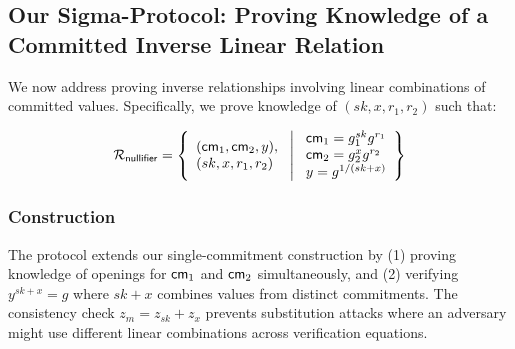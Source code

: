 \subsection{Our Sigma-Protocol: Proving Knowledge of a Committed Inverse Linear Relation}\label{sec-pok-committed-inv-linear-relation}

We now address proving inverse relationships involving linear combinations of committed values. Specifically, we prove knowledge of $(sk, x, r_1, r_2)$ such that:

\[
\mathcal{R}_{\mathsf{nullifier}} = \left\{ 
\begin{array}{l} (\mathsf{cm}_1, \mathsf{cm}_2, y),\\
(sk, x, r_1, r_2) 
\end{array}
\ \middle|
\ \begin{array}{l}
\mathsf{cm}_1 = g_1^{sk} g^{r_1} \\
\mathsf{cm}_2 = g_2^{x} g^{r_2} \\
y = g^{1/(sk + x)} \\
\end{array} \right\}
\]







\subsubsection{Construction}
The protocol extends our single-commitment construction by (1) proving knowledge of openings for $\mathsf{cm}_1$ and $\mathsf{cm}_2$ simultaneously, and (2) verifying $y^{sk+x} = g$ where $sk+x$ combines values from distinct commitments. The consistency check $z_m = z_{sk} + z_x$ prevents substitution attacks where an adversary might use different linear combinations across verification equations.

